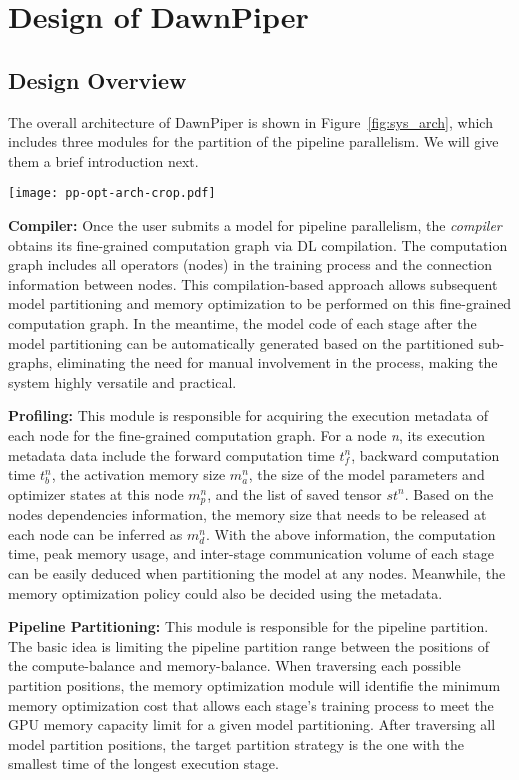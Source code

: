 \section{Design of DawnPiper}
\label{sec:design}
\subsection{Design Overview}
The overall architecture of DawnPiper is shown in Figure~\ref{fig:sys_arch},
which includes three modules for the partition of the pipeline parallelism.
We will give them a brief introduction next.

\begin{figure*}[t]
  \centering
  \texttt{[image: pp-opt-arch-crop.pdf]}
  \caption{DawnPiper System Architecture}
  \label{fig:sys_arch}
\end{figure*}

\textbf{Compiler:} Once the user submits a model for pipeline parallelism,
the \emph{compiler} obtains its fine-grained computation graph via DL compilation.
The computation graph includes all operators (nodes) in the training process and
the connection information between nodes.
This compilation-based approach allows subsequent model partitioning
and memory optimization to be performed
on this fine-grained computation graph.
In the meantime, the model code of each stage after the model partitioning
can be automatically generated based on the partitioned sub-graphs,
eliminating the need for manual involvement in the process,
making the system highly versatile and practical.

\textbf{Profiling:} This module is responsible for acquiring the
execution metadata of each node for the fine-grained computation graph.
For a node \emph{n}, its execution metadata data include the forward computation time $t_f^n$,
backward computation time $t_b^n$, the activation memory size $m_a^n$,
the size of the model parameters and optimizer states at this node $m_p^n$,
and the list of saved tensor ${st}^n$.
Based on the nodes dependencies information,
the memory size that needs to be released at each node can be inferred as $m_d^n$.
With the above information, the computation time, peak memory usage,
and inter-stage communication volume of each stage can
be easily deduced when partitioning the model at any nodes.
Meanwhile, the memory optimization policy could also be decided using the metadata.

\textbf{Pipeline Partitioning:} This module is responsible for the pipeline partition.
The basic idea is limiting the pipeline partition range between
the positions of the compute-balance and memory-balance.
When traversing each possible partition positions,
the memory optimization module will identifie the minimum
memory optimization cost that allows each stage's training process to
meet the GPU memory capacity limit for a given model partitioning.
After traversing all model partition positions,
the target partition strategy is the one with the
smallest time of the longest execution stage.

